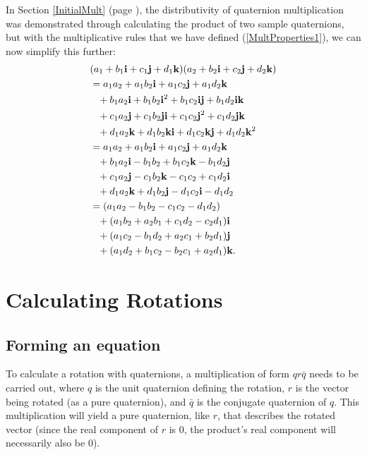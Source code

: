 \documentclass[10pt]{article}
\begin{document}
In Section \ref{InitialMult} (page \pageref{InitialMult}), the distributivity of quaternion multiplication was demonstrated through calculating the product of two sample quaternions, but with the multiplicative rules that we have defined (\ref{MultProperties1}), we can now simplify this further:
\begin{equation}
    \begin{aligned}
        & (a_1 + b_1\vb{i} + c_1\vb{j} + d_1\vb{k})(a_2 + b_2\vb{i} + c_2\vb{j} + d_2\vb{k}) \\
        & = a_1a_2 + a_1b_2\vb{i} + a_1c_2\vb{j} + a_1d_2\vb{k} \\
        & \phantom{=} + b_1a_2\vb{i} + b_1b_2\vb{i}^2 + b_1c_2\vb{i}\vb{j} + b_1d_2\vb{i}\vb{k} \\
        & \phantom{=} + c_1a_2\vb{j} + c_1b_2\vb{j}\vb{i} + c_1c_2\vb{j}^2 + c_1d_2\vb{j}\vb{k} \\
        & \phantom{=} + d_1a_2\vb{k} + d_1b_2\vb{k}\vb{i} + d_1c_2\vb{k}\vb{j} + d_1d_2\vb{k}^2 \\
        & = a_1a_2 + a_1b_2\vb{i} + a_1c_2\vb{j} + a_1d_2\vb{k} \\
        & \phantom{=} + b_1a_2\vb{i} - b_1b_2 + b_1c_2\vb{k} - b_1d_2\vb{j} \\
        & \phantom{=} + c_1a_2\vb{j} - c_1b_2\vb{k} - c_1c_2 + c_1d_2\vb{i} \\
        & \phantom{=} + d_1a_2\vb{k} + d_1b_2\vb{j} - d_1c_2\vb{i} - d_1d_2  \\
        & = (a_1a_2 - b_1b_2 - c_1c_2 - d_1d_2) \\
        & \phantom{=} + (a_1b_2 + a_2b_1 + c_1d_2 - c_2d_1)\vb{i} \\
        & \phantom{=} + (a_1c_2 - b_1d_2 + a_2c_1 + b_2d_1)\vb{j} \\
        & \phantom{=} + (a_1d_2 + b_1c_2 - b_2c_1 + a_2d_1)\vb{k}.
    \end{aligned}
\end{equation}

\section{Calculating Rotations}

\subsection{Forming an equation} \label{qrqIntro}

To calculate a rotation with quaternions, a multiplication of form $qr\bar{q}$ \cite{DRose} needs to be carried out, where $q$ is the unit quaternion defining the rotation, $r$ is the vector being rotated (as a pure quaternion), and $\bar{q}$ is the conjugate quaternion of $q$. This multiplication will yield a pure quaternion, like $r$, that describes the rotated vector (since the real component of $r$ is 0, the product's real component will necessarily also be 0).
\end{document}
